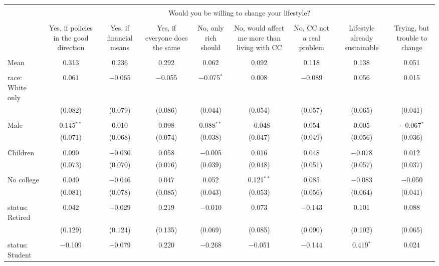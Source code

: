 
\begin{tabular}{@{\extracolsep{5pt}}lcccccccc} 
\\[-1.8ex]\hline 
\hline \\[-1.8ex] 
 & \multicolumn{8}{c}{Would you be willing to change your lifestyle?} \\ 
\cline{2-9} 
\\[-1.8ex] & Yes, if policies in the good direction & Yes, if financial means & Yes, if everyone does the same & No, only rich should & No, would affect me more than living with CC & No, CC not a real problem & Lifestyle already sustainable & Trying, but trouble to change \\ 
\hline \\[-1.8ex] 
 Mean & 0.313 & 0.236 & 0.292 & 0.062 & 0.092 & 0.118 & 0.138 & 0.051  \\ \hline \\[-1.8ex] race: White only & 0.061 & $-$0.065 & $-$0.055 & $-$0.075$^{*}$ & 0.008 & $-$0.089 & 0.056 & 0.015 \\ 
  & (0.082) & (0.079) & (0.086) & (0.044) & (0.054) & (0.057) & (0.065) & (0.041) \\ 
  & & & & & & & & \\ 
 Male & 0.145$^{**}$ & 0.010 & 0.098 & 0.088$^{**}$ & $-$0.048 & 0.054 & 0.005 & $-$0.067$^{*}$ \\ 
  & (0.071) & (0.068) & (0.074) & (0.038) & (0.047) & (0.049) & (0.056) & (0.036) \\ 
  & & & & & & & & \\ 
 Children & 0.090 & $-$0.030 & 0.058 & $-$0.005 & 0.016 & 0.048 & $-$0.078 & 0.012 \\ 
  & (0.073) & (0.070) & (0.076) & (0.039) & (0.048) & (0.051) & (0.057) & (0.037) \\ 
  & & & & & & & & \\ 
 No college & 0.040 & $-$0.046 & 0.047 & 0.052 & 0.121$^{**}$ & 0.085 & $-$0.083 & $-$0.050 \\ 
  & (0.081) & (0.078) & (0.085) & (0.043) & (0.053) & (0.056) & (0.064) & (0.041) \\ 
  & & & & & & & & \\ 
 status: Retired & 0.042 & $-$0.029 & 0.219 & $-$0.010 & 0.073 & $-$0.143 & 0.101 & 0.088 \\ 
  & (0.129) & (0.124) & (0.135) & (0.069) & (0.085) & (0.090) & (0.102) & (0.065) \\ 
  & & & & & & & & \\ 
 status: Student & $-$0.109 & $-$0.079 & 0.220 & $-$0.268 & $-$0.051 & $-$0.144 & 0.419$^{*}$ & 0.024 \\ 

\end{tabular}
